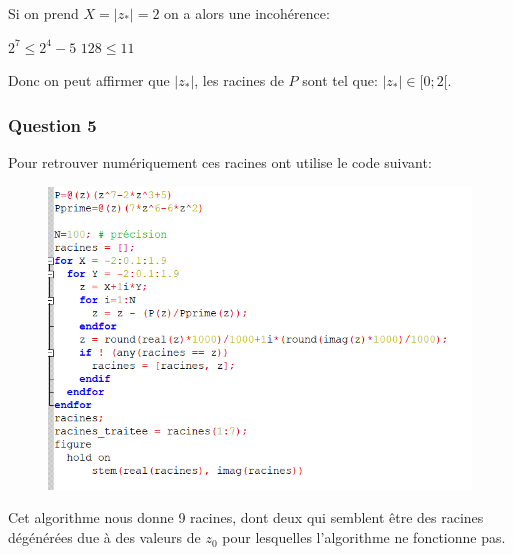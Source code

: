 \documentclass{article}
\begin{document}
	Si on prend $X=|z_{*}|=2$ on a alors une incohérence: 
	
	\begin{large}
	\begin{center}
			$2^{7} \le 2^{4}-5$
			$128 \le 11$
	\end{center}	
	\end{large}
	
	Donc on peut affirmer que $|z_{*}|$, les racines de $P$ sont tel que: $|z_{*}| \in [0; 2[$.
	
	\subsubsection{Question 5}
	
	Pour retrouver numériquement ces racines ont utilise le code suivant:
	
	\begin{center}
		\begin{figure}[H]
			\includegraphics[scale=1]{./img/algo_new_deg_7.png}
		\end{figure}
	\end{center}
	
	Cet algorithme nous donne 9 racines, dont deux qui semblent être des racines dégénérées due à des valeurs de $z_{0}$ pour lesquelles l'algorithme ne fonctionne pas.
	
\end{document}

